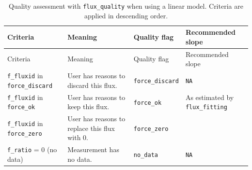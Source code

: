 \documentclass[
  letterpaper,
  DIV=11,
  numbers=noendperiod]{scrartcl}
\begin{document}
\begin{longtable}[]{@{}
  >{\raggedright\arraybackslash}p{}
  >{\raggedright\arraybackslash}p{}
  >{\raggedright\arraybackslash}p{}
  >{\raggedright\arraybackslash}p{}@{}}
\caption{\normalsize Quality assessment with \texttt{flux\_quality} when
using a linear model. Criteria are applied in descending
order.}\label{tbl-flagslm}\tabularnewline
\toprule\noalign{}
\begin{minipage}[b]{\linewidth}\raggedright
Criteria
\end{minipage} & \begin{minipage}[b]{\linewidth}\raggedright
Meaning
\end{minipage} & \begin{minipage}[b]{\linewidth}\raggedright
Quality flag
\end{minipage} & \begin{minipage}[b]{\linewidth}\raggedright
Recommended slope
\end{minipage} \\
\midrule\noalign{}
\endfirsthead
\toprule\noalign{}
\begin{minipage}[b]{\linewidth}\raggedright
Criteria
\end{minipage} & \begin{minipage}[b]{\linewidth}\raggedright
Meaning
\end{minipage} & \begin{minipage}[b]{\linewidth}\raggedright
Quality flag
\end{minipage} & \begin{minipage}[b]{\linewidth}\raggedright
Recommended slope
\end{minipage} \\
\midrule\noalign{}
\endhead
\bottomrule\noalign{}
\endlastfoot
\texttt{f\_fluxid} in \texttt{force\_discard} & User has reasons to
discard this flux. & \texttt{force\_discard} & \texttt{NA} \\
\texttt{f\_fluxid} in \texttt{force\_ok} & User has reasons to keep this
flux. & \texttt{force\_ok} & As estimated by \texttt{flux\_fitting} \\
\texttt{f\_fluxid} in \texttt{force\_zero} & User has reasons to replace
this flux with 0. & \texttt{force\_zero} & 0 \\
\texttt{f\_ratio} = 0 (no data) & Measurement has no data. &
\texttt{no\_data} & \texttt{NA} \\

\end{longtable}
\end{document}
